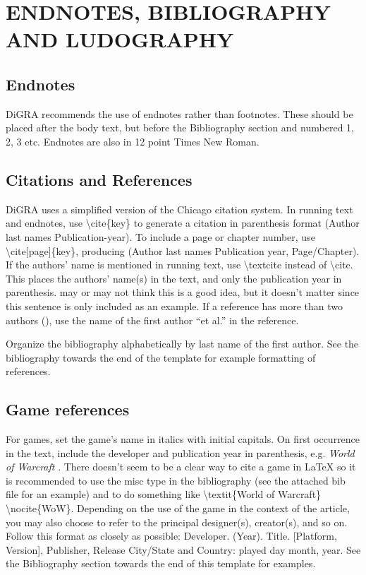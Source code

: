 \documentclass[11pt]{article}
\let\originalcite\cite
\renewcommand*{\cite}[1]{(\originalcite{#1})}
\begin{document}
\section*{ENDNOTES, BIBLIOGRAPHY AND LUDOGRAPHY}
\subsection*{Endnotes}
DiGRA recommends the use of endnotes rather than footnotes. These should be placed
after the body text, but before the Bibliography section and numbered 1, 2, 3 etc.
Endnotes are also in 12 point Times New Roman.

\subsection*{Citations and References}
DiGRA uses a simplified version of the Chicago citation system. In running text and
endnotes, use \textbackslash cite\{key\} to generate a citation in parenthesis format (Author last names Publication-year).
To include a page or chapter number, use \textbackslash cite[page]\{key\}, producing
(Author last names Publication year, Page/Chapter). If the
authors' name is mentioned in running text, use \textbackslash textcite instead of \textbackslash cite.
This places the authors' name(s) in the text, and only the publication year in parenthesis.
\textcite[453]{ethics} may or may not think this is a good idea, but it doesn't matter since
this sentence is only included as an example. If a reference has more than two authors
\cite{schwartz.1995}, use the name of the first author ``et al.'' in the reference. 

Organize the bibliography alphabetically by last name of the first author. See the
bibliography towards the end of the template for example formatting of references.
\subsection*{Game references}
For games, set the game's name in italics with initial capitals. On first occurrence in the
text, include the developer and publication year in parenthesis, e.g. \textit{World of Warcraft}
\nocite{WoW}. There doesn't seem to be a clear way to cite a game in LaTeX so it is recommended to use the misc type in the bibliography (see the attached bib file for an example) and to do something like \textbackslash textit\{World of Warcraft\} \textbackslash nocite\{WoW\}.  Depending on the use of the game in the context of the article, you may
also choose to refer to the principal designer(s), creator(s), and so on. Follow this format
as closely as possible:
Developer. (Year). Title. [Platform, Version], Publisher, Release City/State and Country:
played day month, year.
See the Bibliography section towards the end of this template for examples.
\end{document}
